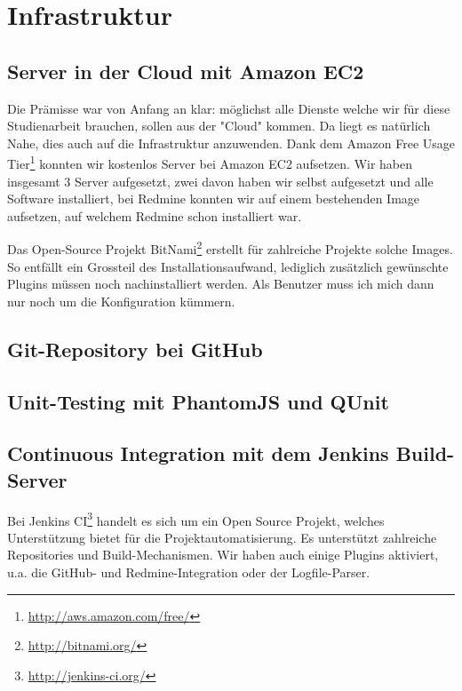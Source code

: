 \chapter{Infrastruktur}
\label{infrastruktur}
\section{Server in der Cloud mit Amazon EC2}
Die Prämisse war von Anfang an klar: möglichst alle Dienste welche wir für diese Studienarbeit brauchen, sollen aus der "Cloud" kommen. Da liegt es natürlich Nahe, dies auch auf die Infrastruktur anzuwenden. Dank dem Amazon Free Usage Tier\footnote{\url{http://aws.amazon.com/free/}} konnten wir kostenlos Server bei Amazon EC2 aufsetzen. Wir haben insgesamt 3 Server aufgesetzt, zwei davon haben wir selbst aufgesetzt und alle Software installiert, bei Redmine konnten wir auf einem bestehenden Image aufsetzen, auf welchem Redmine schon installiert war.

Das Open-Source Projekt BitNami\footnote{\url{http://bitnami.org/}} erstellt für zahlreiche Projekte solche Images. So entfällt ein Grossteil des Installationsaufwand, lediglich zusätzlich gewünschte Plugins müssen noch nachinstalliert werden. Als Benutzer muss ich mich dann nur noch um die Konfiguration kümmern.

\section{Git-Repository bei GitHub}

\section{Unit-Testing mit PhantomJS und QUnit}

\section{Continuous Integration mit dem Jenkins Build-Server}
Bei Jenkins CI\footnote{\url{http://jenkins-ci.org/}} handelt es sich um ein Open Source Projekt, welches Unterstützung bietet für die Projektautomatisierung. Es unterstützt zahlreiche Repositories und Build-Mechanismen. Wir haben auch einige Plugins aktiviert, u.a. die GitHub- und Redmine-Integration oder der Logfile-Parser.

